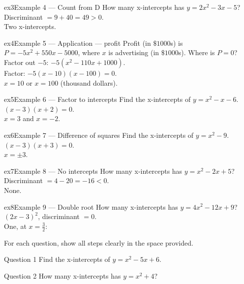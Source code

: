 \documentclass[11pt]{article}
\begin{document}
\begin{example}{ex3}{Example 4 --- Count from D}
How many x-intercepts has $y=2x^2-3x-5$?\soln Discriminant $=9+40=49>0$. \\ Two x-intercepts.
\end{example}

\begin{example}{ex4}{Example 5 --- Application — profit}
Profit (in $\$1000$s) is $P=-5x^2+550x-5000$, where $x$ is advertising (in $\$1000$s). Where is $P=0$?\soln Factor out $-5$: $-5(x^2-110x+1000)$. \\ Factor: $-5(x-10)(x-100)=0$. \\ $x=10$ or $x=100$ (thousand dollars).
\end{example}

\begin{example}{ex5}{Example 6 --- Factor to intercepts}
Find the x-intercepts of $y=x^2-x-6$.\soln $(x-3)(x+2)=0$. \\ $x=3$ and $x=-2$.
\end{example}

\begin{example}{ex6}{Example 7 --- Difference of squares}
Find the x-intercepts of $y=x^2-9$.\soln $(x-3)(x+3)=0$. \\ $x=\pm3$.
\end{example}

\begin{example}{ex7}{Example 8 --- No intercepts}
How many x-intercepts has $y=x^2-2x+5$?\soln Discriminant $=4-20=-16<0$. \\ None.
\end{example}

\begin{example}{ex8}{Example 9 --- Double root}
How many x-intercepts has $y=4x^2-12x+9$?\soln $(2x-3)^2$, discriminant $=0$. \\ One, at $x=\tfrac32$:
\end{example}

\clearpage
{}
For each question, show all steps clearly in the space provided.

\begin{qbox}{Question 1}
Find the x-intercepts of $y=x^2-5x+6$.\workspace{2.4cm}
\end{qbox}

\begin{qbox}{Question 2}
How many x-intercepts has $y=x^2+4$?\workspace{2.4cm}
\end{qbox}
\end{document}
